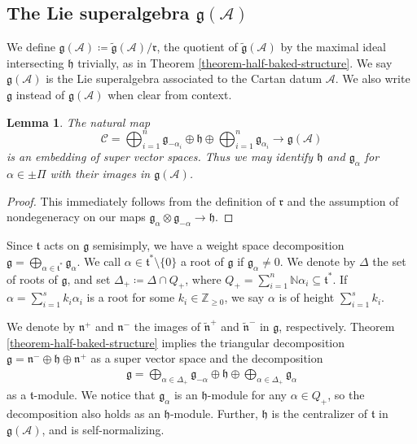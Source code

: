 \documentclass[12pt, a4paper, reqno]{amsart}
\def\AA{\mathcal{A}}
\def\g{\mathfrak{g}}
\def\h{\mathfrak{h}}
\def\r{\mathfrak{r}}
\newtheorem{lemma}{Lemma}
\theoremstyle{definition}
\theoremstyle{definition}
\theoremstyle{definition}
\numberwithin{theorem}{section}
\numberwithin{lemma}{section}
\numberwithin{remark}{section}
\numberwithin{definition}{section}
\numberwithin{corollary}{section}
\numberwithin{proposition}{section}
\numberwithin{example}{section}
\begin{document}
	\subsection{The Lie superalgebra \(\mathfrak{g}(\mathcal{A})\)}\label{section-g(A)}
	
	We define \(\mathfrak{g}(\mathcal{A}) \coloneq \tilde{\mathfrak{g}}(\mathcal{A})/\mathfrak{r}\), the quotient of \(\tilde{\mathfrak{g}}(\mathcal{A})\) by the maximal ideal intersecting \(\mathfrak{h}\) trivially, as in Theorem \ref{theorem-half-baked-structure}. We say \(\mathfrak{g}(\mathcal{A})\) is the Lie superalgebra associated to the Cartan datum \(\mathcal{A}\). We also write \(\mathfrak{g}\) instead of \(\mathfrak{g}(\mathcal{A})\) when clear from context. 
	
	\begin{lemma}
		The natural map 
		\[
		\mathcal{C} = \bigoplus_{i=1}^n \mathfrak{g}_{-\alpha_i} \oplus \mathfrak{h} \oplus \bigoplus_{i=1}^n \mathfrak{g}_{\alpha_i}\to\g(\AA)
		\]
		is an embedding of super vector spaces.  Thus we may identify $\h$ and $\g_{\alpha}$ for $\alpha\in\pm\Pi$ with their images in $\g(\AA)$.
	\end{lemma}

	\begin{proof}
		This immediately follows from the definition of $\r$ and the assumption of nondegeneracy on our maps $\g_{\alpha}\otimes\g_{-\alpha}\to\h$.
\end{proof}
	
	Since $\mathfrak{t}$ acts on $\g$ semisimply, we have a weight space decomposition $\g=\bigoplus\limits_{\alpha\in\mathfrak{t}^*}\g_{\alpha}$.  We call \(\alpha \in \mathfrak{t}^*\setminus\{0\}\) a root of \(\mathfrak{g}\) if \(\mathfrak{g}_{\alpha} \neq 0\). We denote by \(\Delta\) the set of roots of \(\mathfrak{g}\), and set \(\Delta_+ \coloneq \Delta \cap Q_+\), where $Q_+=\sum\limits_{i=1}^n\mathbb{N}\alpha_i\subseteq\mathfrak{t}^*$. If \(\alpha = \sum_{i=1}^{s} k_i\alpha_i\) is a root for some \(k_i \in \mathbb{Z}_{\geq 0}\), we say \(\alpha\) is of height \(\sum_{i=1}^sk_i\). 
	
	We denote by \(\mathfrak{n}^+\) and \(\mathfrak{n}^-\) the images of \(\tilde{\mathfrak{n}}^+\) and \(\tilde{\mathfrak{n}}^-\) in \(\mathfrak{g}\), respectively. Theorem \ref{theorem-half-baked-structure} implies the triangular decomposition \(\mathfrak{g} = \mathfrak{n}^-\oplus \mathfrak{h} \oplus \mathfrak{n}^+\) as a super vector space and the decomposition
	\begin{align*}
		\mathfrak{g} = \bigoplus_{\alpha\in\Delta_+} \mathfrak{g}_{-\alpha} \oplus \mathfrak{h} \oplus \bigoplus_{\alpha \in \Delta_+} \mathfrak{g}_{\alpha}
	\end{align*}
	as a \(\mathfrak{t}\)-module. We notice that \(\mathfrak{g}_{\alpha}\) is an \(\mathfrak{h}\)-module for any \(\alpha \in Q_+\), so the decomposition also holds as an \(\mathfrak{h}\)-module.  Further, $\h$ is the centralizer of $\mathfrak{t}$ in $\g(\AA)$, and is self-normalizing.
	
\end{document}
